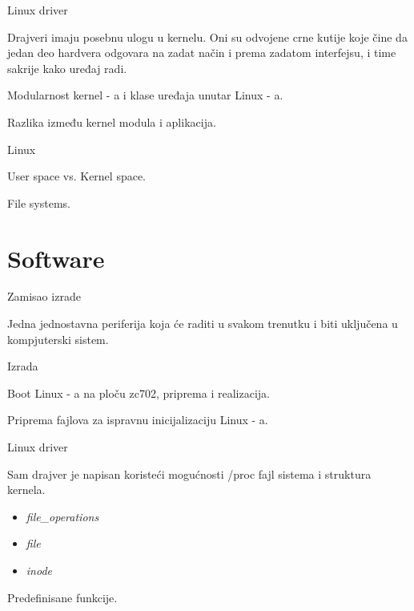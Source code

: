 \documentclass[10pt]{beamer}
\begin{document}
\begin{frame}{Linux driver}

		Drajveri imaju posebnu ulogu u kernelu. Oni su odvojene crne kutije koje čine da jedan deo hardvera odgovara na zadat način i prema zadatom interfejsu, i time sakrije kako uređaj radi.
	
		\bigskip	
	
		Modularnost kernel - a i klase uređaja unutar Linux - a.
		
		\bigskip		
		
		Razlika između kernel modula i aplikacija.
		
\end{frame}

\begin{frame}{Linux}
	
	User space vs. Kernel space.
	
	\bigskip	
	
	File systems.	
	
\end{frame}

\section{Software}

\begin{frame}{Zamisao izrade}
	
	Jedna jednostavna periferija koja će raditi u svakom trenutku i biti uključena u kompjuterski sistem.
		
\end{frame}

\begin{frame}{Izrada}
	
	Boot Linux - a na ploču zc702, priprema i realizacija.
	
	\bigskip	
	
	Priprema fajlova za ispravnu inicijalizaciju Linux - a.
	
\end{frame}

\begin{frame}{Linux driver}
	
	Sam drajver je napisan koristeći mogućnosti /proc fajl sistema i struktura kernela.	
	
	\bigskip	
	
	\begin{itemize}
	
		\item \textit{file\_operations}
		\item \textit{file}
		\item \textit{inode}
		
	\end{itemize}	
	
	\bigskip
	
	Predefinisane funkcije.
	
\end{frame}
\end{document}
